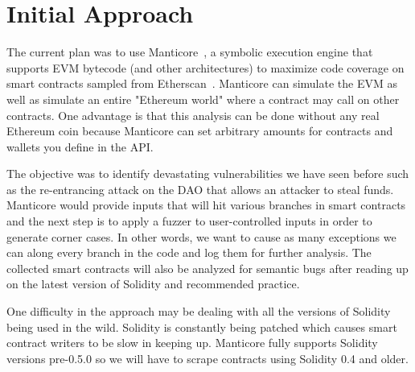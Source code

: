 \section{Initial Approach}

The current plan was to use Manticore~\cite{manticore}, a symbolic execution engine that supports EVM bytecode (and other architectures) to maximize code coverage on smart contracts sampled from Etherscan~\cite{etherscan}.
Manticore can simulate the EVM as well as simulate an entire "Ethereum world" where a contract may call on other contracts.
One advantage is that this analysis can be done without any real Ethereum coin because Manticore can set arbitrary amounts for contracts and wallets you define in the API.

The objective was to identify devastating vulnerabilities we have seen before such as the re-entrancing attack on the DAO that allows an attacker to steal funds.
Manticore would provide inputs that will hit various branches in smart contracts and the next step is to apply a fuzzer to user-controlled inputs in order to generate corner cases.
In other words, we want to cause as many exceptions we can along every branch in the code and log them for further analysis.
The collected smart contracts will also be analyzed for semantic bugs after reading up on the latest version of Solidity and recommended practice.

One difficulty in the approach may be dealing with all the versions of Solidity being used in the wild.
Solidity is constantly being patched which causes smart contract writers to be slow in keeping up.
Manticore fully supports Solidity versions pre-0.5.0 so we will have to scrape contracts using Solidity 0.4 and older.


